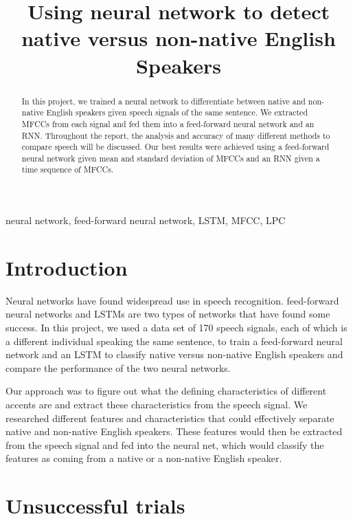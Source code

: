 \documentclass{article}
\title{Using neural network to detect native versus non-native English Speakers}
\begin{document}

\maketitle

\begin{abstract}
	In this project, we trained a neural network to differentiate between native and non-native English speakers given speech signals of the same sentence.
	We extracted MFCCs from each signal and fed them into a feed-forward neural network and an RNN.
	Throughout the report, the analysis and accuracy of many different methods to compare speech will be discussed. 
	Our best results were achieved using a feed-forward neural network given mean and standard deviation of MFCCs and an RNN given a time sequence of MFCCs.
\end{abstract}

\begin{keywords}
neural network,
feed-forward neural network,
LSTM,
MFCC,
LPC
\end{keywords}

\section{Introduction}
\label{sec:intro}

Neural networks have found widespread use in speech recognition.
feed-forward neural networks \cite{microsoft} and LSTMs \cite{google} are two types of networks that have found some success. 
In this project, we used a data set of 170 speech signals, each of which is a different individual speaking the same sentence, to train a feed-forward neural network and an LSTM to classify native versus non-native English speakers and compare the performance of the two neural networks. 

Our approach was to figure out what the defining characteristics of different accents are and extract these characteristics from the speech signal.
We researched different features and characteristics that could effectively separate native and non-native English speakers.
These features would then be extracted from the speech signal and fed into the neural net, which would classify the features as coming from a native or a non-native English speaker.

\section{Unsuccessful trials}
\label{sec:unsuccessful}
\end{document}
